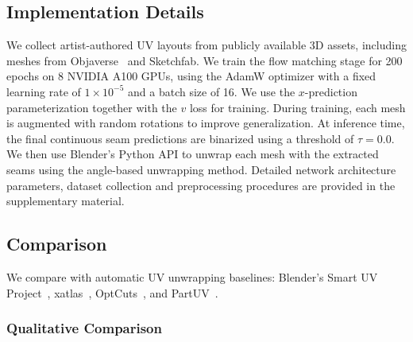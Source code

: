 \subsection{Implementation Details}
\label{sec:impl}
We collect artist-authored UV layouts from publicly available 3D assets, including meshes from Objaverse~\cite{objaverse,objaverseXL} and Sketchfab. 
We train the flow matching stage for 200 epochs on 8 NVIDIA A100 GPUs, using the AdamW optimizer with a fixed learning rate of $1\times10^{-5}$ and a batch size of 16.  
We use the $x$-prediction parameterization together with the $v$ loss for training. During training, each mesh is augmented with random rotations to improve generalization. At inference time, the final continuous seam predictions are binarized using a threshold of $\tau = 0.0$. We then use Blender's Python API to unwrap each mesh with the extracted seams using the angle-based unwrapping method. Detailed network architecture parameters, dataset collection and preprocessing procedures are provided in the supplementary material.



\subsection{Comparison}
\label{sec:Comparison}
We compare \methodname{} with automatic UV unwrapping baselines: Blender's Smart UV Project~\cite{blender}, xatlas~\cite{young2019xatlas}, OptCuts~\cite{li2018optcuts}, and PartUV~\cite{wang2025partuv}.

\subsubsection{Qualitative Comparison}
\label{sec:qualitative}

